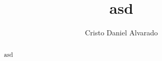 \documentclass[12pt]{article}
\theoremstyle{largebreak}
\begin{document}
    \setlength{\parskip}{5pt}
    \setlength{\parindent}{12pt}
    \title{asd}
    \author{Cristo Daniel Alvarado}
    \maketitle

    \begin{abstract}
      asd
    \end{abstract}

    \tableofcontents


    \newpage

    

    
\end{document}
